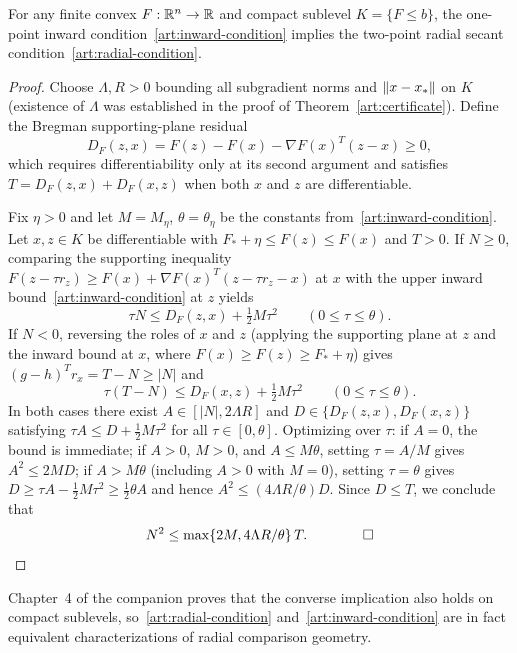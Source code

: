 \begin{theorem}\label{art:radial-equivalence}
For any finite convex $F:\mathbb R^n\to\mathbb R$ and compact sublevel $K=\{F\le b\}$, the
one-point inward condition~\eqref{art:inward-condition} implies the two-point
radial secant condition~\eqref{art:radial-condition}.
\end{theorem}
\begin{proof}
Choose $\Lambda,R>0$ bounding all subgradient norms and $\lVert x-x_*\rVert$ on $K$
(existence of $\Lambda$ was established in the proof of
Theorem~\ref{art:certificate}). Define the Bregman supporting-plane
residual~\cite{BB}
\[
 D_F(z,x)=F(z)-F(x)-\nabla F(x)^T(z-x)\ge0,
\]
which requires differentiability only at its second argument and satisfies
$T=D_F(z,x)+D_F(x,z)$ when both $x$ and $z$ are differentiable.

Fix $\eta>0$ and let $M=M_\eta$, $\theta=\theta_\eta$ be the constants
from~\eqref{art:inward-condition}. Let $x,z\in K$ be differentiable with
$F_*+\eta\le F(z)\le F(x)$ and $T>0$. If $N\ge0$, comparing the supporting
inequality $F(z-\tau r_z)\ge F(x)+\nabla F(x)^T(z-\tau r_z-x)$ at $x$ with the
upper inward bound~\eqref{art:inward-condition} at $z$ yields
\[
 \tau N\le D_F(z,x)+\tfrac12M\tau^2\qquad(0\le\tau\le\theta).
\]
If $N<0$, reversing the roles of $x$ and $z$ (applying the supporting plane at
$z$ and the inward bound at $x$, where $F(x)\ge F(z)\ge F_*+\eta$) gives
$(g-h)^Tr_x=T-N\ge|N|$ and
\[
 \tau(T-N)\le D_F(x,z)+\tfrac12M\tau^2\qquad(0\le\tau\le\theta).
\]
In both cases there exist $A\in[|N|,2\Lambda R]$ and $D\in\{D_F(z,x),D_F(x,z)\}$
satisfying $\tau A\le D+\tfrac12M\tau^2$ for all $\tau\in[0,\theta]$. Optimizing
over $\tau$: if $A=0$, the bound is immediate; if $A>0$, $M>0$, and
$A\le M\theta$, setting $\tau=A/M$ gives $A^2\le2MD$; if $A>M\theta$ (including
$A>0$ with $M=0$), setting $\tau=\theta$ gives
$D\ge\tau A-\tfrac12M\tau^2\ge\tfrac12\theta A$ and hence
$A^2\le(4\Lambda R/\theta)D$. Since $D\le T$, we conclude that
\begin{equation}\label{art:inward-to-radial}
 N^2\le \max\{2M,4\Lambda R/\theta\}\,T.\qquad\qed
\end{equation}
\end{proof}

Chapter~4 of the companion proves that the converse implication also holds on
compact sublevels, so~\eqref{art:radial-condition} and~\eqref{art:inward-condition}
are in fact equivalent characterizations of radial comparison geometry.

